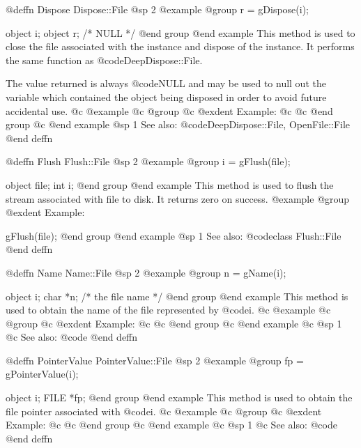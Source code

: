 @deffn {Dispose} Dispose::File
@sp 2
@example
@group
r = gDispose(i);

object  i;
object  r;     /*  NULL  */
@end group
@end example
This method is used to close the file associated with the instance and
dispose of the instance.  It performs the same function as
@code{DeepDispose::File}.  

The value returned is always @code{NULL} and may be used to null out
the variable which contained the object being disposed in order to
avoid future accidental use.
@c @example
@c @group
@c @exdent Example:
@c 
@c @end group
@c @end example
@sp 1
See also:  @code{DeepDispose::File, OpenFile::File}
@end deffn






@deffn {Flush} Flush::File
@sp 2
@example
@group
i = gFlush(file);

object file;
int  i;
@end group
@end example
This method is used to flush the stream associated with
file to disk.  It returns zero on success.
@example
@group
@exdent Example:

gFlush(file);
@end group
@end example
@sp 1
See also:  @code{class Flush::File}
@end deffn










@deffn {Name} Name::File
@sp 2
@example
@group
n = gName(i);

object  i;
char    *n;  /*  the file name  */
@end group
@end example
This method is used to obtain the name of the file represented by @code{i}.
@c @example
@c @group
@c @exdent Example:
@c 
@c @end group
@c @end example
@c @sp 1
@c See also:  @code{}
@end deffn







@deffn {PointerValue} PointerValue::File
@sp 2
@example
@group
fp = gPointerValue(i);

object  i;
FILE    *fp;
@end group
@end example
This method is used to obtain the file pointer associated with @code{i}.
@c @example
@c @group
@c @exdent Example:
@c 
@c @end group
@c @end example
@c @sp 1
@c See also:  @code{}
@end deffn






